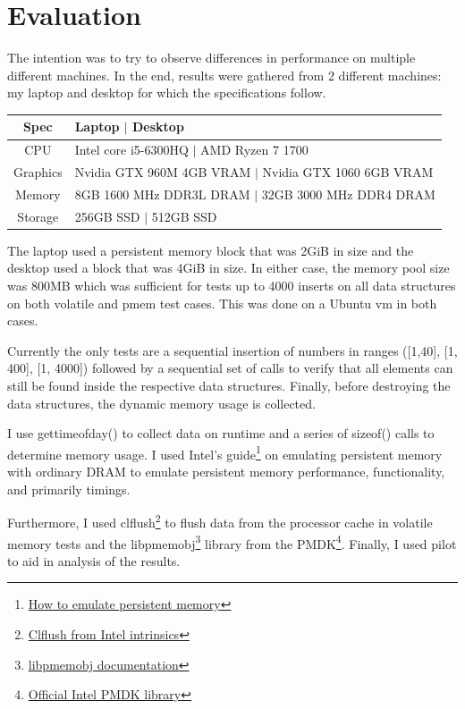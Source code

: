 \documentclass[twocolumn]{article}
\begin{document}
\section{Evaluation}

The intention was to try to observe differences in performance on multiple
different machines. In the end, results were gathered from 2 different machines:
my laptop and desktop for which the specifications follow.

\begin{center}
  \begin{tabularx}{\linewidth}{ | c | X | }
    \hline
    Spec & Laptop $|$ Desktop\\ \hline \hline
    CPU & Intel core i5-6300HQ $|$ AMD Ryzen 7 1700\\ \hline
    Graphics & Nvidia GTX 960M 4GB VRAM $|$ Nvidia GTX 1060 6GB VRAM\\ \hline
    Memory & 8GB 1600 MHz DDR3L DRAM $|$ 32GB 3000 MHz DDR4 DRAM\\ \hline
    Storage & 256GB SSD $|$ 512GB SSD\\ \hline
  \end{tabularx}
\end{center}

The laptop used a persistent memory block that was 2GiB in size and the desktop
used a block that was 4GiB in size. In either case, the memory pool size was
800MB which was sufficient for tests up to 4000 inserts on all data structures
on both volatile and pmem test cases. This was done on a Ubuntu vm in both
cases.

Currently the only tests are a sequential insertion of numbers in ranges
([1,40], [1, 400], [1, 4000]) followed by a sequential set of calls to verify
that all elements can still be found inside the respective data structures.
Finally, before destroying the data structures, the dynamic memory usage is
collected.

I use gettimeofday() to collect data on runtime and a series of sizeof() calls
to determine memory usage. I used Intel's
guide\footnote{\href{https://software.intel.com/en-us/articles/how-to-emulate-persistent-memory-on-an-intel-architecture-server/}{How
to emulate persistent memory}}
on emulating persistent memory with ordinary DRAM to emulate persistent memory
performance, functionality, and primarily timings.

Furthermore, I used
clflush\footnote{\href{https://software.intel.com/sites/landingpage/IntrinsicsGuide/\#text=clflush&expand=658,657}{Clflush
from Intel intrinsics}} to flush data from the processor cache in volatile
memory tests and the
libpmemobj\footnote{\href{http://pmem.io/pmdk/libpmemobj/}{libpmemobj
documentation}} library from the
PMDK\footnote{\href{https://github.com/pmem/pmdk}{Official Intel PMDK library}}.
Finally, I used pilot to aid in analysis of the results.
\end{document}
